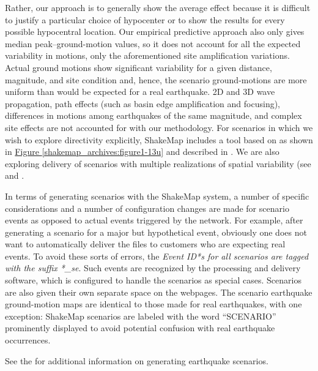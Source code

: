 \documentclass[letterpaper,10pt,english]{sphinxmanual}
\begin{document}
Rather, our approach is to generally show the average effect because it is difficult to justify a
particular choice of hypocenter or to show the results for every possible hypocentral
location. Our empirical predictive approach also only gives median peak--ground-motion
values, so it does not account for all the expected variability in motions, only the
aforementioned site amplification variations. Actual ground motions show significant
variability for a given distance, magnitude, and site condition and, hence, the scenario
ground-motions are more uniform than would be expected for a real earthquake.
2D and 3D wave propagation, path effects (such as
basin edge amplification and focusing), differences in motions among earthquakes of the
same magnitude, and complex site effects are not accounted for with our methodology.
For scenarios in which we wish to explore directivity explicitly, ShakeMap includes a
tool based on {\hyperref[references:rowshandel2010]{}} as shown in
\hyperref[shakemap_archives:figure1-13u]{Figure  \ref*{shakemap_archives:figure1-13u}} and described in {\hyperref[tg_processing:sec\string-directivity]{}}. We
are also exploring delivery of scenarios with multiple realizations of
spatial variability (see {\hyperref[future_directions:future\string-directions]{}} and {\hyperref[references:verros2016]{}}.

In terms of generating scenarios with the ShakeMap system, a number of specific
considerations and a number of configuration changes are made for scenario events as
opposed to actual events triggered by the network.  For example, after generating a
scenario for a major but hypothetical event, obviously one does not want to automatically
deliver the files to customers who are expecting real events.  To avoid these sorts of
errors, the \emph{Event ID*s for all scenarios are tagged with the suffix *\_se}. Such events are
recognized by the processing and delivery software, which is configured to handle the
scenarios as special cases. Scenarios are also given their own separate space on the
webpages. The scenario earthquake ground-motion maps are identical to those made for real earthquakes, with one exception: ShakeMap scenarios are labeled with the word “SCENARIO” prominently displayed to avoid potential confusion with real earthquake occurrences.

See the {\hyperref[software_guide:software\string-guide]{}} for additional information on generating earthquake scenarios.
\end{document}
